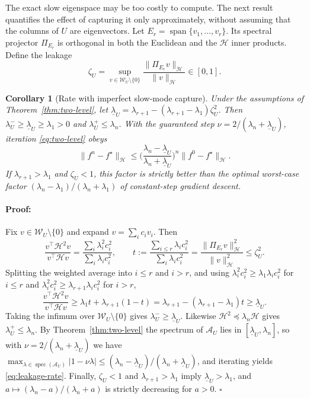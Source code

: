 \documentclass{article}
\newenvironment{proof}{\paragraph{Proof:}}{\hfill$\square$}
\newtheorem{corollary}[theorem]{Corollary}
\begin{document}
The exact slow eigenspace may be too costly to compute. The next result quantifies the effect of capturing it only approximately, without assuming that the columns of $U$ are eigenvectors. Let $E_r=\operatorname{span}\{v_1,\dots,v_r\}$. Its spectral projector $\Pi_{E_r}$ is orthogonal in both the Euclidean and the $\mathcal H$ inner products. Define the leakage
\begin{equation}
\label{eq:leakage}
\zeta_U=\sup_{v\in\mathcal W_U\setminus\{0\}}\frac{\|\Pi_{E_r}v\|_{\mathcal H}}{\|v\|_{\mathcal H}}\in[0,1].
\end{equation}

\begin{corollary}[Rate with imperfect slow-mode capture]
\label{cor:leakage}
Under the assumptions of Theorem~\ref{thm:two-level}, let $\underline\lambda_U=\lambda_{r+1}-(\lambda_{r+1}-\lambda_1)\zeta_U^2$. Then $\lambda_U^-\ge\underline\lambda_U\ge\lambda_1>0$ and $\lambda_U^+\le\lambda_n$. With the guaranteed step $\nu=2/(\lambda_n+\underline\lambda_U)$, iteration \eqref{eq:two-level} obeys
\begin{equation}
\label{eq:leakage-rate}
\|f^n-f^\star\|_{\mathcal H}\le\Big(\frac{\lambda_n-\underline\lambda_U}{\lambda_n+\underline\lambda_U}\Big)^n\|f^0-f^\star\|_{\mathcal H}.
\end{equation}
If $\lambda_{r+1}>\lambda_1$ and $\zeta_U<1$, this factor is strictly better than the optimal worst-case factor $(\lambda_n-\lambda_1)/(\lambda_n+\lambda_1)$ of constant-step gradient descent.
\end{corollary}

\begin{proof}
Fix $v\in\mathcal W_U\setminus\{0\}$ and expand $v=\sum_ic_iv_i$. Then
\[
\frac{v^\top\mathcal H^2v}{v^\top\mathcal Hv}=\frac{\sum_i\lambda_i^2c_i^2}{\sum_i\lambda_ic_i^2},
\qquad
t:=\frac{\sum_{i\le r}\lambda_ic_i^2}{\sum_i\lambda_ic_i^2}=\frac{\|\Pi_{E_r}v\|_{\mathcal H}^2}{\|v\|_{\mathcal H}^2}\le\zeta_U^2 .
\]
Splitting the weighted average into $i\le r$ and $i>r$, and using $\lambda_i^2c_i^2\ge\lambda_1\lambda_ic_i^2$ for $i\le r$ and $\lambda_i^2c_i^2\ge\lambda_{r+1}\lambda_ic_i^2$ for $i>r$,
\[
\frac{v^\top\mathcal H^2v}{v^\top\mathcal Hv}\ge\lambda_1t+\lambda_{r+1}(1-t)=\lambda_{r+1}-(\lambda_{r+1}-\lambda_1)t\ge\underline\lambda_U .
\]
Taking the infimum over $\mathcal W_U\setminus\{0\}$ gives $\lambda_U^-\ge\underline\lambda_U$. Likewise $\mathcal H^2\preceq\lambda_n\mathcal H$ gives $\lambda_U^+\le\lambda_n$. By Theorem~\ref{thm:two-level} the spectrum of $\mathcal A_U$ lies in $[\underline\lambda_U,\lambda_n]$, so with $\nu=2/(\lambda_n+\underline\lambda_U)$ we have $\max_{\lambda\in\operatorname{spec}(\mathcal A_U)}|1-\nu\lambda|\le(\lambda_n-\underline\lambda_U)/(\lambda_n+\underline\lambda_U)$, and iterating yields \eqref{eq:leakage-rate}. Finally, $\zeta_U<1$ and $\lambda_{r+1}>\lambda_1$ imply $\underline\lambda_U>\lambda_1$, and $a\mapsto(\lambda_n-a)/(\lambda_n+a)$ is strictly decreasing for $a>0$.
\end{proof}
\end{document}
